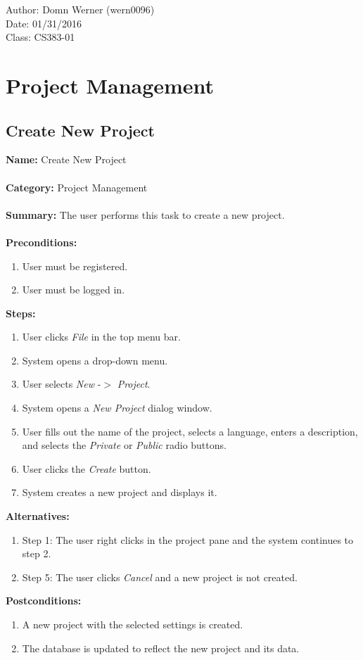 \documentclass[14pt, a4paper]{article}
\begin{document}
\noindent Author: Domn Werner (wern0096) \\
Date: 01/31/2016 \\
Class: CS383-01

\tableofcontents

\newpage

\section{Project Management}

\subsection{Create New Project}

\begin{framed}
	\noindent\textbf{Name:} Create New Project \\ \\
	\textbf{Category:} Project Management \\ \\
	\textbf{Summary:} The user performs this task to create a new project. \\ \\
	\textbf{Preconditions:} 
	\begin{enumerate}
		\item User must be registered.
		\item User must be logged in.
	\end{enumerate}
	\textbf{Steps:}
	\begin{enumerate}
		\item User clicks \textit{File} in the top menu bar.
		\item System opens a drop-down menu.
		\item User selects \textit{New} -$>$ \textit{Project}.
		\item System opens a \textit{New Project} dialog window.
		\item User fills out the name of the project, selects a language, enters a description, and selects the \textit{Private} or \textit{Public} radio buttons.
		\item User clicks the \textit{Create} button.
		\item System creates a new project and displays it.
	\end{enumerate}
	\textbf{Alternatives:} 
	\begin{enumerate}
		\item Step 1: The user right clicks in the project pane and the system continues to step 2.
		\item Step 5: The user clicks \textit{Cancel} and a new project is not created.
	\end{enumerate}
	\textbf{Postconditions:}
	\begin{enumerate}
		\item A new project with the selected settings is created.
		\item The database is updated to reflect the new project and its data.
	\end{enumerate}
\end{framed} 
\end{document}
